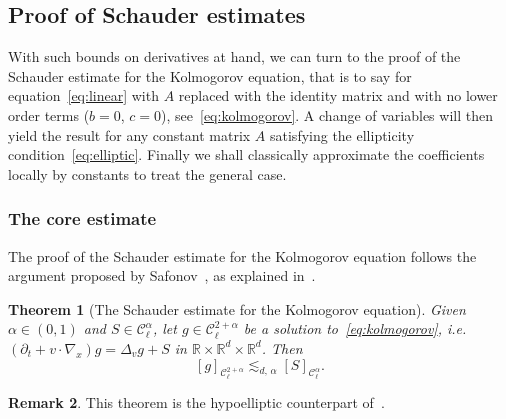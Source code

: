 \documentclass[10pt]{amsart}
\newtheorem{theo}{Theorem}[section]
\theoremstyle{definition}\newtheorem{defi}[theo]{Definition}\newtheorem{rema}[theo]{Remark}\newtheorem{exam}[theo]{Example}\newtheorem{exem}[theo]{Example}\newtheorem{nota}[theo]{Notation}
\newcommand{\R}{\mathbb{R}}
\newcommand{\cC}{\mathcal{C}}
\begin{document}
\subsection{Proof of Schauder estimates}

With such bounds on derivatives at hand, we can turn to the proof of the Schauder estimate for the Kolmogorov equation, that is to say for equation~\eqref{eq:linear} with $A$ replaced with the identity matrix and with no lower order terms ($b=0$, $c=0$), see~\eqref{eq:kolmogorov}. A change of variables will then yield the result for any constant matrix $A$ satisfying the ellipticity condition~\eqref{eq:elliptic}. Finally we shall classically approximate the coefficients locally by constants to treat the general case.

\subsubsection{The core estimate}

The proof of the Schauder estimate for the Kolmogorov equation follows the argument proposed by Safonov~\cite{safonov1984}, as explained in~\cite{krylov1996}.
\begin{theo}[The Schauder estimate for the Kolmogorov
equation]\label{thm:constant}
Given $\alpha \in (0,1)$ and $S \in \cC_\ell^\alpha$, let $g \in \cC_\ell^{2+\alpha}$ be a solution to~\eqref{eq:kolmogorov}, i.e. $(\partial_t + v \cdot \nabla_x) g = \Delta_v g + S$ in $\R \times \R^d \times \R^d$. Then
\[
[g]_{\cC_\ell^{2+\alpha}} \lesssim_{d,\,\alpha} [S]_{\cC_\ell^\alpha}.
\]
\end{theo}

\begin{rema}
This theorem is the hypoelliptic counterpart of~\cite[Theorem~8.6.1~\& Lemma~8.7.1]{krylov1996}.
\end{rema}
\end{document}
